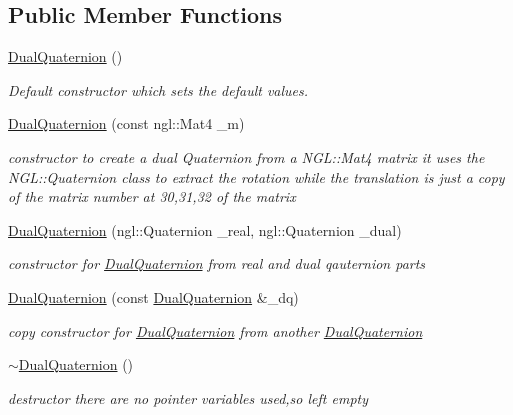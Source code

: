 \subsection*{Public Member Functions}
\begin{DoxyCompactItemize}
\item 
\hyperlink{class_dual_quaternion_aff76abcae3e1e0ecadb307a89faa7a3c}{Dual\-Quaternion} ()
\begin{DoxyCompactList}\small\item\em Default constructor which sets the default values. \end{DoxyCompactList}\item 
\hyperlink{class_dual_quaternion_aee110100fa0f143ebb5355319b855e9f}{Dual\-Quaternion} (const ngl\-::\-Mat4 \-\_\-m)
\begin{DoxyCompactList}\small\item\em constructor to create a dual Quaternion from a N\-G\-L\-::\-Mat4 matrix it uses the N\-G\-L\-::\-Quaternion class to extract the rotation while the translation is just a copy of the matrix number at 30,31,32 of the matrix \end{DoxyCompactList}\item 
\hyperlink{class_dual_quaternion_a58aa74a1752233a50b23411f328c09ce}{Dual\-Quaternion} (ngl\-::\-Quaternion \-\_\-real, ngl\-::\-Quaternion \-\_\-dual)
\begin{DoxyCompactList}\small\item\em constructor for \hyperlink{class_dual_quaternion}{Dual\-Quaternion} from real and dual qauternion parts \end{DoxyCompactList}\item 
\hyperlink{class_dual_quaternion_a6a50baa2c818f4d37c91bc68bdb80605}{Dual\-Quaternion} (const \hyperlink{class_dual_quaternion}{Dual\-Quaternion} \&\-\_\-dq)
\begin{DoxyCompactList}\small\item\em copy constructor for \hyperlink{class_dual_quaternion}{Dual\-Quaternion} from another \hyperlink{class_dual_quaternion}{Dual\-Quaternion} \end{DoxyCompactList}\item 
\hyperlink{class_dual_quaternion_a87368eaa09b0875d186cb04b8ba4575b}{$\sim$\-Dual\-Quaternion} ()
\begin{DoxyCompactList}\small\item\em destructor there are no pointer variables used,so left empty \end{DoxyCompactList}\item 

\end{DoxyCompactItemize}
